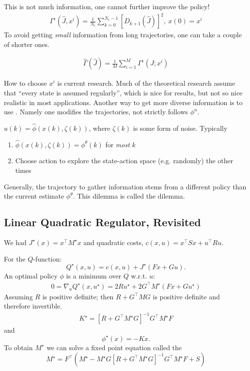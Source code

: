 This is not much information, one cannot further improve the policy! 
\begin{align*}
    \Gamma^\epsilon(\hat{J},x^i)=\frac{1}{N_\epsilon}\sum_{k=0}^{N_\epsilon-1}[D_{k+1}(\hat{J})]^2, \ x(0)=x^i
\end{align*}
To avoid getting \textit{small} information from long trajectories, one 
can take a couple of shorter ones.

\begin{align*}
    \hat{\Gamma}(\hat{J})=\frac{1}{M}\sum_{i=1}^M\Gamma^\epsilon(J;x^i)
\end{align*}

How to choose \(x^i\) is current research. Much of the theoretical research 
assume that ``every state is assumed regularly'', which is nice for results, but not so nice realistic 
in most applications. 
Another way to get more diverse information is to use . Namely
one modifies the trajectories, not strictly follows \(\phi^n\). 

\(u(k)=\hat{\phi}(x(k),\zeta(k))\), where \(\zeta(k)\) is some form of noise.
Typically 
\begin{enumerate}
    \item \(\hat{\phi}(x(k),\zeta(k))=\phi^\theta(k)\) for \textit{most} \(k\)
    \item Choose action to explore the state-action space (e.g. randomly) the other times
\end{enumerate}

Generally, the trajectory to gather information 
stems from a different policy than the current estimate \(\phi^\theta\). 
This dilemma is called the  dilemma.

\subsection{Linear Quadratic Regulator, Revisited} 

We had \(J^\star(x)=x^\intercal M^\star x\) and quadratic costs,
\(c(x,u)=x^\intercal S x+ u^\intercal R u\).

For the \(Q\)-function: 
\[Q^\star(x,u)=c(x,u)+J^\star(Fx+Gu).\]
An optimal policy \(\phi\) is a minimum over \(Q\) w.r.t. \(u\):
\begin{align*}
    0=\nabla_u Q^\star(x,u^\star)=2Ru^\star+2G^\intercal M^\star(Fx + Gu^\star)
\end{align*}
Assuming \(R\) is positive definite; then \(R+G^\intercal M G\) is positive definite
and therefore invertible.
\begin{align*}
    K^\star=\left[R+G^\intercal M^\star G\right]^{-1}G^\intercal M^\star F
\end{align*}
and 
\[\phi^\star(x)=-Kx.\]
To obtain \(M^\star\) we can solve
a fixed point equation called the 
\begin{equation}\label{eq:algebraic_riccati}
    M^\star=F^\intercal\left(M^\star-M^\star G\left[R+G^\intercal M^\star G\right]^{-1}G^\intercal M^\star F+S\right)
\end{equation} 
